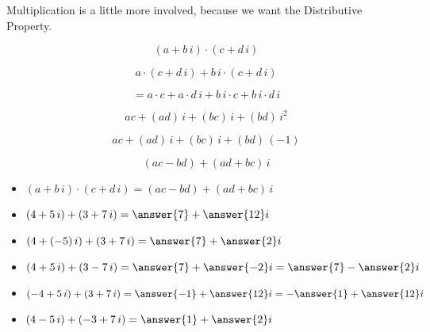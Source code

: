 \documentclass{ximera}
\begin{document}
Multiplication is a little more involved, because we want the Distributive Property.

\[
(a + b \, i) \cdot (c + d \, i) 
\]

\[
a \cdot (c + d \, i) + b \, i \cdot (c + d \, i) 
\]

\[
= a \cdot c + a \cdot d \, i + b \, i \cdot c  + b \, i \cdot d \, i
\]

\[
a c  + (a d) \, i + (b c) \, i  + (b d) \, i^2
\]


\[
a c  + (a d) \, i + (b c) \, i + (b d) \, (-1)
\]


\[
(a c - b d) + (a d + b c) \, i 
\]



\begin{itemize}
	\item $(a + b \, i) \cdot (c + d \, i) = (ac - bd) + (ad + bc) \, i$
\end{itemize}










\begin{question}


\begin{itemize}
\item   $(4 + 5 \, i) + (3 + 7 \, i) = \answer{7} + \answer{12} i$
\item   $(4 + (-5) \, i) + (3 + 7 \, i) = \answer{7} + \answer{2} i$
\item   $(4 + 5 \, i) + (3 - 7 \, i) = \answer{7} + \answer{-2} i = \answer{7} - \answer{2} i$
\item   $(-4 + 5 \, i) + (3 + 7 \, i) = \answer{-1} + \answer{12} i = -\answer{1} + \answer{12} i$
\item   $(4 - 5 \, i) + (-3 + 7 \, i) = \answer{1} + \answer{2} i$
\end{itemize}



\end{question}
\end{document}
